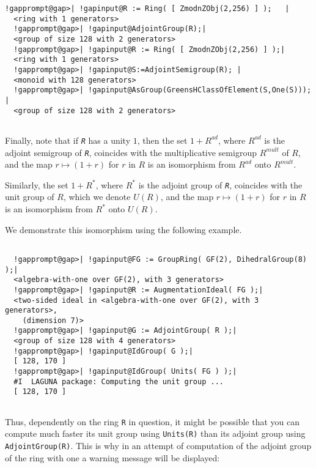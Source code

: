 \documentclass[a4paper,11pt]{report}
\begin{document}
{{{\begin{Verbatim}[commandchars=!@|,fontsize=\small,frame=single,label=Example]
  !gapprompt@gap>| !gapinput@R := Ring( [ ZmodnZObj(2,256) ] );   |
  <ring with 1 generators>
  !gapprompt@gap>| !gapinput@AdjointGroup(R);|
  <group of size 128 with 2 generators>
  !gapprompt@gap>| !gapinput@R := Ring( [ ZmodnZObj(2,256) ] );|
  <ring with 1 generators>
  !gapprompt@gap>| !gapinput@S:=AdjointSemigroup(R); |
  <monoid with 128 generators>
  !gapprompt@gap>| !gapinput@AsGroup(GreensHClassOfElement(S,One(S))); |
  <group of size 128 with 2 generators>
  
\end{Verbatim}
 Finally, note that if \mbox{\texttt{\mdseries\slshape R}} has a unity $1$, then the set $1+R^{ad}$, where $R^{ad}$ is the adjoint semigroup of \mbox{\texttt{\mdseries\slshape R}}, coincides with the multiplicative semigroup $R^{mult}$ of $R$, and the map $ r \mapsto (1+r) $ for $r$ in $R$ is an isomorphism from $R^{ad}$ onto $R^{mult}$. 

 Similarly, the set $1+R^*$, where $R^{*}$ is the adjoint group of \mbox{\texttt{\mdseries\slshape R}}, coincides with the unit group of $R$, which we denote $U(R)$, and the map $r \mapsto (1+r)$ for $r$ in $R$ is an isomorphism from $R^*$ onto $U(R)$. 

 We demonstrate this isomorphism using the following example. 
\begin{Verbatim}[commandchars=!@|,fontsize=\small,frame=single,label=Example]
  
  !gapprompt@gap>| !gapinput@FG := GroupRing( GF(2), DihedralGroup(8) );|
  <algebra-with-one over GF(2), with 3 generators>
  !gapprompt@gap>| !gapinput@R := AugmentationIdeal( FG );|
  <two-sided ideal in <algebra-with-one over GF(2), with 3 generators>, 
    (dimension 7)>
  !gapprompt@gap>| !gapinput@G := AdjointGroup( R );|
  <group of size 128 with 4 generators>
  !gapprompt@gap>| !gapinput@IdGroup( G );|
  [ 128, 170 ]
  !gapprompt@gap>| !gapinput@IdGroup( Units( FG ) );|
  #I  LAGUNA package: Computing the unit group ...
  [ 128, 170 ]
  
\end{Verbatim}
 Thus, dependently on the ring \texttt{R} in question, it might be possible that you can compute much faster its unit
group using \texttt{Units(R)} than its adjoint group using \texttt{AdjointGroup(R)}. This is why in an attempt of computation of the adjoint group of the ring
with one a warning message will be displayed: 

 
\begin{Verbatim}[commandchars=@|B,fontsize=\small,frame=single,label=Example]
  

\end{Verbatim}}}}
\end{document}
